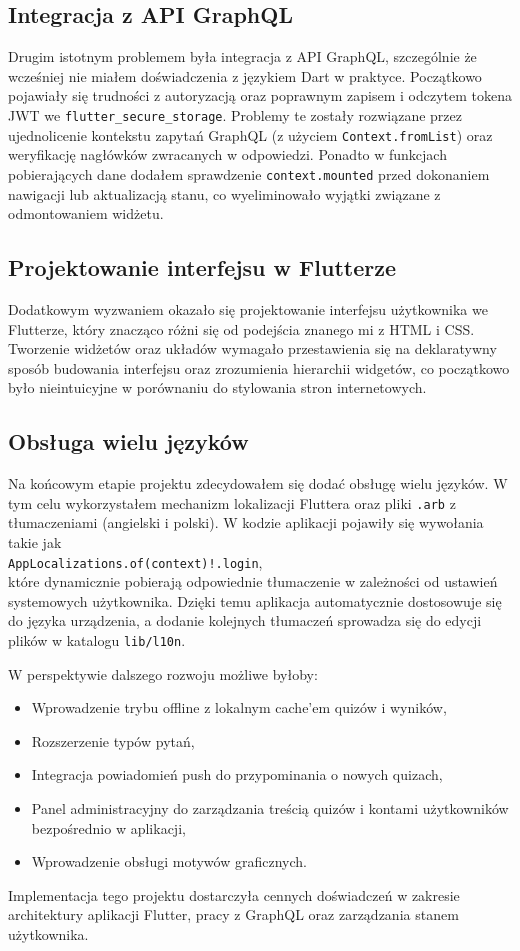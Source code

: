 \documentclass{article}
\begin{document}
	\subsection{Integracja z API GraphQL}
	Drugim istotnym problemem była integracja z API GraphQL, szczególnie że wcześniej nie miałem doświadczenia z językiem Dart w praktyce. Początkowo pojawiały się trudności z autoryzacją oraz poprawnym zapisem i odczytem tokena JWT we \texttt{flutter\_secure\_storage}. Problemy te zostały rozwiązane przez ujednolicenie kontekstu zapytań GraphQL (z użyciem \texttt{Context.fromList}) oraz weryfikację nagłówków zwracanych w odpowiedzi. Ponadto w funkcjach pobierających dane dodałem sprawdzenie \texttt{context.mounted} przed dokonaniem nawigacji lub aktualizacją stanu, co wyeliminowało wyjątki związane z odmontowaniem widżetu.
	
	\subsection{Projektowanie interfejsu w Flutterze}
	Dodatkowym wyzwaniem okazało się projektowanie interfejsu użytkownika we Flutterze, który znacząco różni się od podejścia znanego mi z HTML i CSS. Tworzenie widżetów oraz układów wymagało przestawienia się na deklaratywny sposób budowania interfejsu oraz zrozumienia hierarchii widgetów, co początkowo było nieintuicyjne w porównaniu do stylowania stron internetowych.
	
	\subsection{Obsługa wielu języków}
	Na końcowym etapie projektu zdecydowałem się dodać obsługę wielu języków. W tym celu wykorzystałem mechanizm lokalizacji Fluttera oraz pliki \texttt{.arb} z tłumaczeniami (angielski i polski). W kodzie aplikacji pojawiły się wywołania takie jak \\
	\texttt{AppLocalizations.of(context)!.login}, \\
	które dynamicznie pobierają odpowiednie tłumaczenie w zależności od ustawień systemowych użytkownika. Dzięki temu aplikacja automatycznie dostosowuje się do języka urządzenia, a dodanie kolejnych tłumaczeń sprowadza się do edycji plików w katalogu \texttt{lib/l10n}.

	\vspace{0.3cm}

W perspektywie dalszego rozwoju możliwe byłoby:
\begin{itemize}
  \item Wprowadzenie trybu offline z lokalnym cache’em quizów i wyników,
  \item Rozszerzenie typów pytań,
  \item Integracja powiadomień push do przypominania o nowych quizach,
  \item Panel administracyjny do zarządzania treścią quizów i kontami użytkowników bezpośrednio w aplikacji,
  \item Wprowadzenie obsługi motywów graficznych.
\end{itemize}

Implementacja tego projektu dostarczyła cennych doświadczeń w zakresie architektury aplikacji Flutter, pracy z GraphQL oraz zarządzania stanem użytkownika.
\end{document}
